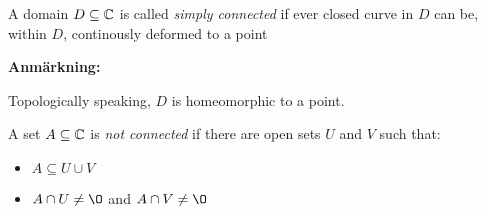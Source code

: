 \par\bigskip
\begin{theo}{}
  A domain $D\subseteq\mathbb{C}$ is called \textit{simply connected} if ever closed curve in $D$ can be, within $D$, continously deformed to a point 
\end{theo}
\par\bigskip
\noindent\textbf{Anmärkning:}\par
\noindent Topologically speaking, $D$ is homeomorphic to a point. 
\par\bigskip
\begin{theo}{}
  A set $A\subseteq\mathbb{C}$ is \textit{not connected} if there are open sets $U$ and $V$ such that:\par
  \begin{itemize}
    \item $A\subseteq U\cup V$
    \item $A\cap U\neq\O$ and $A\cap V\neq\O$
  \end{itemize}
\end{theo}
\newpage
